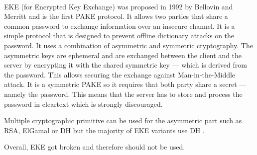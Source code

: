 \documentclass[../report.tex]{subfiles}
\begin{document}
\paragraph{}

EKE (for Encrypted Key Exchange) was proposed in 1992 by Bellovin and Merritt \cite{EKE_Paper} and is the first PAKE protocol. 
It allows two parties that share a common password to exchange information over an insecure channel.
It is a simple protocol that is designed to prevent offline dictionary attacks on the password.
It uses a combination of asymmetric and symmetric cryptography.
The asymmetric keys are ephemeral and are exchanged between the client and the server by encrypting it with the shared symmetric key --- which is derived from the password.
This allows securing the exchange against Man-in-the-Middle attack. %
It is a symmetric PAKE so it requires that both party share a secret --- namely the password. This means that the server has to store and process the password in cleartext which is strongly discouraged. %


Multiple cryptographic primitive can be used for the asymmetric part such as RSA, ElGamal or DH but the majority of EKE variants use DH \cite{Breaking_EKE}. %

Overall, EKE got broken and therefore should not be used. %






\paragraph{}
\end{document}
